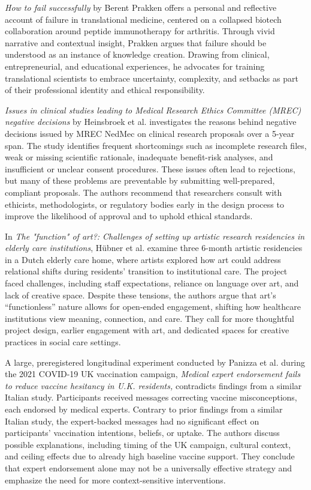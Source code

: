 \documentclass[authordate, empirical]{jote-new-article}
\begin{document}
	\emph{How to fail successfully} by Berent Prakken offers a personal and reflective account of failure in translational medicine, centered on a collapsed biotech collaboration around peptide immunotherapy for arthritis. Through vivid narrative and contextual insight, Prakken argues that failure should be understood as an instance of knowledge creation. Drawing from clinical, entrepreneurial, and educational experiences, he advocates for training translational scientists to embrace uncertainty, complexity, and setbacks as part of their professional identity and ethical responsibility.



	\emph{Issues in clinical studies leading to Medical Research Ethics Committee (MREC) negative decisions} by Heinsbroek et al. investigates the reasons behind negative decisions issued by MREC NedMec on clinical research proposals over a 5-year span. The study identifies frequent shortcomings such as incomplete research files, weak or missing scientific rationale, inadequate benefit-risk analyses, and insufficient or unclear consent procedures. These issues often lead to rejections, but many of these problems are preventable by submitting well-prepared, compliant proposals. The authors recommend that researchers consult with ethicists, methodologists, or regulatory bodies early in the design process to improve the likelihood of approval and to uphold ethical standards.



	In \emph{The "function" of art?: Challenges of setting up artistic research residencies in elderly care institutions}, Hübner et al. examine three 6-month artistic residencies in a Dutch elderly care home, where artists explored how art could address relational shifts during residents' transition to institutional care. The project faced challenges, including staff expectations, reliance on language over art, and lack of creative space. Despite these tensions, the authors argue that art's “functionless” nature allows for open-ended engagement, shifting how healthcare institutions view meaning, connection, and care. They call for more thoughtful project design, earlier engagement with art, and dedicated spaces for creative practices in social care settings.



	A large, preregistered longitudinal experiment conducted by Panizza et al. during the 2021 COVID-19 UK vaccination campaign, \emph{Medical expert endorsement fails to reduce vaccine hesitancy in U.K. residents,} contradicts findings from a similar Italian study. Participants received messages correcting vaccine misconceptions, each endorsed by medical experts. Contrary to prior findings from a similar Italian study, the expert-backed messages had no significant effect on participants' vaccination intentions, beliefs, or uptake. The authors discuss possible explanations, including timing of the UK campaign, cultural context, and ceiling effects due to already high baseline vaccine support. They conclude that expert endorsement alone may not be a universally effective strategy and emphasize the need for more context-sensitive interventions.
\end{document}
